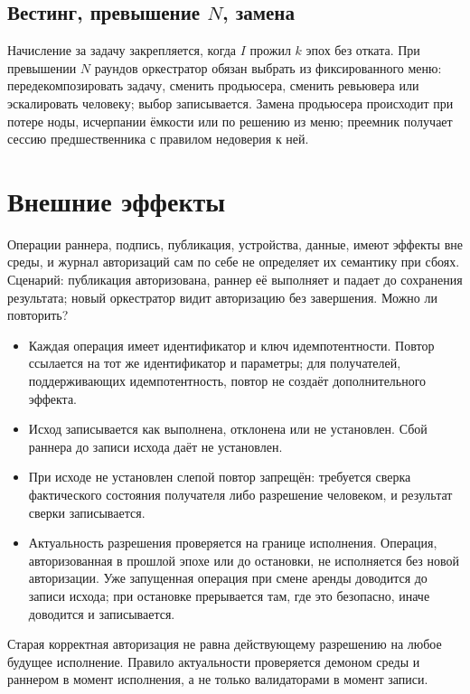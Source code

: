 \subsection{Вестинг, превышение $N$, замена}

Начисление за задачу закрепляется, когда $I$ прожил $k$ эпох без отката. При превышении $N$ раундов оркестратор обязан выбрать из фиксированного меню: передекомпозировать задачу, сменить продьюсера, сменить ревьювера или эскалировать человеку; выбор записывается. Замена продьюсера происходит при потере ноды, исчерпании ёмкости или по решению из меню; преемник получает сессию предшественника с правилом недоверия к ней.

\section{Внешние эффекты}

Операции раннера, подпись, публикация, устройства, данные, имеют эффекты вне среды, и журнал авторизаций сам по себе не определяет их семантику при сбоях. Сценарий: публикация авторизована, раннер её выполняет и падает до сохранения результата; новый оркестратор видит авторизацию без завершения. Можно ли повторить?

\begin{itemize}
\item Каждая операция имеет идентификатор и ключ идемпотентности. Повтор ссылается на тот же идентификатор и параметры; для получателей, поддерживающих идемпотентность, повтор не создаёт дополнительного эффекта.
\item Исход записывается как выполнена, отклонена или не установлен. Сбой раннера до записи исхода даёт не установлен.
\item При исходе не установлен слепой повтор запрещён: требуется сверка фактического состояния получателя либо разрешение человеком, и результат сверки записывается.
\item Актуальность разрешения проверяется на границе исполнения. Операция, авторизованная в прошлой эпохе или до остановки, не исполняется без новой авторизации. Уже запущенная операция при смене аренды доводится до записи исхода; при остановке прерывается там, где это безопасно, иначе доводится и записывается.
\end{itemize}

\begin{warnbox}
Старая корректная авторизация не равна действующему разрешению на любое будущее исполнение. Правило актуальности проверяется демоном среды и раннером в момент исполнения, а не только валидаторами в момент записи.
\end{warnbox}

